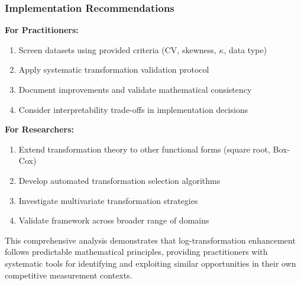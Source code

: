 \subsubsection{Implementation Recommendations}

\textbf{For Practitioners:}
\begin{enumerate}
    \item Screen datasets using provided criteria (CV, skewness, $\kappa$, data type)
    \item Apply systematic transformation validation protocol
    \item Document improvements and validate mathematical consistency
    \item Consider interpretability trade-offs in implementation decisions
\end{enumerate}

\textbf{For Researchers:}
\begin{enumerate}
    \item Extend transformation theory to other functional forms (square root, Box-Cox)
    \item Develop automated transformation selection algorithms
    \item Investigate multivariate transformation strategies
    \item Validate framework across broader range of domains
\end{enumerate}

This comprehensive analysis demonstrates that log-transformation enhancement follows predictable mathematical principles, providing practitioners with systematic tools for identifying and exploiting similar opportunities in their own competitive measurement contexts.
